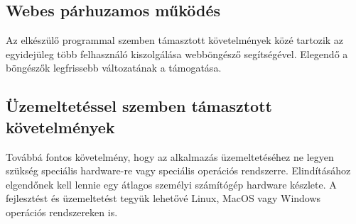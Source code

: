 \subsection{Webes párhuzamos működés}

Az elkészülő programmal szemben támasztott követelmények közé tartozik az egyidejüleg több felhasználó kiszolgálása webböngésző segítségével.
Elegendő a böngészők legfrissebb változatának a támogatása.

\subsection{Üzemeltetéssel szemben támasztott követelmények}
Továbbá fontos követelmény, hogy az alkalmazás üzemeltetéséhez ne legyen szükség speciális hardware-re vagy speciális operációs rendszerre. 
Elindításához elgendőnek kell lennie egy átlagos személyi számítógép hardware készlete. 
A fejlesztést és üzemeltetést tegyük lehetővé Linux, MacOS vagy Windows operációs rendszereken is. 
